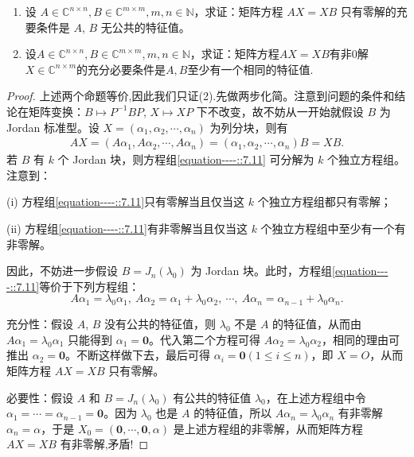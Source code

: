 \documentclass[../../main.tex]{subfiles}
\begin{document}
\begin{proposition}\label{proposition:AX-XB线性映射相关等价条件--(1)}
\begin{enumerate}[(1)]
\item 设 $A\in\mathbb{C}^{n\times n}, B\in\mathbb{C}^{m\times m}, m,n\in\mathbb{N}$，求证：矩阵方程 $AX = XB$ 只有零解的充要条件是 $A$, $B$ 无公共的特征值。

\item 设$A\in\mathbb{C}^{n\times n}, B\in\mathbb{C}^{m\times m}, m,n\in\mathbb{N}$，求证：矩阵方程$AX = XB$有非$0$解$X\in\mathbb{C}^{n\times m}$的充分必要条件是$A,B$至少有一个相同的特征值. 
\end{enumerate}
\end{proposition}
\begin{proof}
上述两个命题等价,因此我们只证(2).先做两步化简。注意到问题的条件和结论在矩阵变换：$B \mapsto P^{-1}BP$, $X \mapsto XP$ 下不改变，故不妨从一开始就假设 $B$ 为 Jordan 标准型。设 $X = (\alpha_1, \alpha_2, \cdots, \alpha_n)$ 为列分块，则有
\begin{align}
AX = (A\alpha_1, A\alpha_2, \cdots, A\alpha_n) = (\alpha_1, \alpha_2, \cdots, \alpha_n)B = XB. \label{equation----::7.11}
\end{align}
若 $B$ 有 $k$ 个 Jordan 块，则方程组\eqref{equation----::7.11} 可分解为 $k$ 个独立方程组。注意到：

(i) 方程组\eqref{equation----::7.11}只有零解当且仅当这 $k$ 个独立方程组都只有零解；

(ii) 方程组\eqref{equation----::7.11}有非零解当且仅当这 $k$ 个独立方程组中至少有一个有非零解。

因此，不妨进一步假设 $B = J_n(\lambda_0)$ 为 Jordan 块。此时，方程组\eqref{equation----::7.11}等价于下列方程组：
\[
A\alpha_1 = \lambda_0\alpha_1,~ A\alpha_2 = \alpha_1 + \lambda_0\alpha_2,~ \cdots,~ A\alpha_n = \alpha_{n - 1} + \lambda_0\alpha_n.
\]

{\heiti 充分性：}假设 $A$, $B$ 没有公共的特征值，则 $\lambda_0$ 不是 $A$ 的特征值，从而由 $A\alpha_1 = \lambda_0\alpha_1$ 只能得到 $\alpha_1 = \mathbf{0}$。代入第二个方程可得 $A\alpha_2 = \lambda_0\alpha_2$，相同的理由可推出 $\alpha_2 = \mathbf{0}$。不断这样做下去，最后可得 $\alpha_i = \mathbf{0} (1 \leq i \leq n)$，即 $X = O$，从而矩阵方程 $AX = XB$ 只有零解。

{\heiti 必要性：}假设 $A$ 和 $B = J_n(\lambda_0)$ 有公共的特征值 $\lambda_0$，在上述方程组中令 $\alpha_1 = \cdots = \alpha_{n - 1} = \mathbf{0}$。因为 $\lambda_0$ 也是 $A$ 的特征值，所以 $A\alpha_n = \lambda_0\alpha_n$ 有非零解 $\alpha_n = \alpha$，于是 $X_0 = (\mathbf{0}, \cdots, \mathbf{0}, \alpha)$ 是上述方程组的非零解，从而矩阵方程 $AX = XB$ 有非零解,矛盾!
\end{proof}
\end{document}
